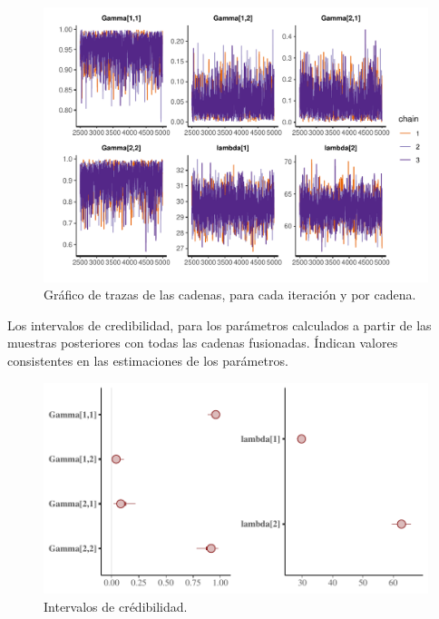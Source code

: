 \documentclass[a4paper]{article}\usepackage[]{graphicx}\usepackage[]{color}
\makeatletter
\def\maxwidth{ %
  \ifdim\Gin@nat@width>\linewidth
    \linewidth
  \else
    \Gin@nat@width
  \fi
}
\newenvironment{knitrout}{}{} %
\makeatother
\begin{document}
\begin{knitrout}
\color{fgcolor}\begin{figure}
\includegraphics[width=\maxwidth]{figure/unnamed-chunk-31-1} \caption[Gráfico de trazas de las cadenas, para cada iteración y por cadena]{Gráfico de trazas de las cadenas, para cada iteración y por cadena.}\label{fig:unnamed-chunk-31}
\end{figure}


\end{knitrout}
                              
Los intervalos de credibilidad, para los parámetros calculados a partir de las muestras posteriores con todas las cadenas fusionadas. Índican valores consistentes en las estimaciones de los parámetros.

\begin{knitrout}
\color{fgcolor}\begin{figure}
\includegraphics[width=\maxwidth]{figure/unnamed-chunk-32-1} \caption[Intervalos de crédibilidad]{Intervalos de crédibilidad.}\label{fig:unnamed-chunk-32}
\end{figure}


\end{knitrout}
\end{document}
